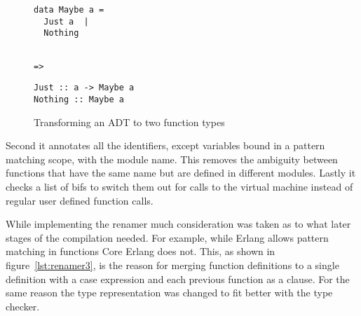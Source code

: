 \begin{figure}[ht]
\centering
{}%
\begin{minipage}[t]{0.30\linewidth}
    \centering
    \begin{lstlisting}
data Maybe a =
  Just a  | 
  Nothing
    \end{lstlisting}
\end{minipage}
\begin{minipage}[t]{0.09\linewidth}
    \centering
    \begin{lstlisting}

=>
    \end{lstlisting}
\end{minipage}
\begin{minipage}[t]{0.30\linewidth}
    \centering
    \begin{lstlisting}
Just :: a -> Maybe a
Nothing :: Maybe a
    \end{lstlisting}
\end{minipage}
\caption{Transforming an ADT to two function types}
\label{lst:renamer2}
\end{figure}

Second it annotates all the identifiers, except variables bound in a pattern matching scope, with the module name. This removes the ambiguity between functions that have the same name but are defined in different modules. Lastly it checks a list of \glspl{bif} to switch them out for calls to the virtual machine instead of regular user defined function calls.

While implementing the renamer much consideration was taken as to what later stages of the compilation needed. For example, while Erlang allows pattern matching in functions Core Erlang does not. This, as shown in figure~\ref{lst:renamer3}, is the reason for merging function definitions to a single definition with a case expression and each previous function as a clause. For the same reason the type representation was changed to fit better with the type checker.

